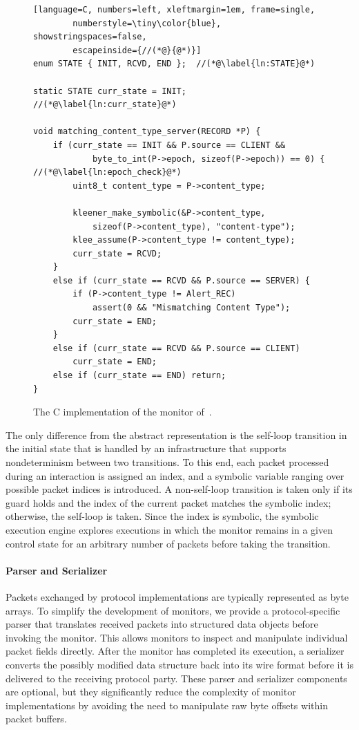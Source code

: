 \begin{figure}[h]
	\begin{lstlisting}[language=C, numbers=left, xleftmargin=1em, frame=single,
		numberstyle=\tiny\color{blue}, showstringspaces=false,
		escapeinside={//(*@}{@*)}]
enum STATE { INIT, RCVD, END };  //(*@\label{ln:STATE}@*)

static STATE curr_state = INIT;  //(*@\label{ln:curr_state}@*)

void matching_content_type_server(RECORD *P) {
	if (curr_state == INIT && P.source == CLIENT &&
			byte_to_int(P->epoch, sizeof(P->epoch)) == 0) { //(*@\label{ln:epoch_check}@*)
		uint8_t content_type = P->content_type;
		
		kleener_make_symbolic(&P->content_type,
			sizeof(P->content_type), "content-type");
		klee_assume(P->content_type != content_type);
		curr_state = RCVD;
	}
	else if (curr_state == RCVD && P.source == SERVER) {
		if (P->content_type != Alert_REC)
			assert(0 && "Mismatching Content Type");
		curr_state = END;
	}
	else if (curr_state == RCVD && P.source == CLIENT)
		curr_state = END;
	else if (curr_state == END) return;
}
	\end{lstlisting}
	\caption{The C implementation of the monitor of~.}
\label{fig:implementation:monitor}
\end{figure}

The only difference from the abstract representation is the self-loop transition in the initial state that is handled by an infrastructure that supports nondeterminism between two transitions.
To this end, each packet processed during an interaction is assigned an index, and a symbolic variable ranging over possible packet indices is introduced.
A non-self-loop transition is taken only if its guard holds and the index of the current packet matches the symbolic index; otherwise, the self-loop is taken.
Since the index is symbolic, the symbolic execution engine explores executions in which the monitor remains in a given control state for an arbitrary number of packets before taking the transition.

\paragraph{Parser and Serializer}
Packets exchanged by protocol implementations are typically represented as byte arrays. To simplify the development of monitors, we provide a protocol-specific parser that translates received packets into structured data objects before invoking the monitor. This allows monitors to inspect and manipulate individual packet fields directly. After the monitor has completed its execution, a serializer converts the possibly modified data structure back into its wire format before it is delivered to the receiving protocol party. These parser and serializer components are optional, but they significantly reduce the complexity of monitor implementations by avoiding the need to manipulate raw byte offsets within packet buffers.

